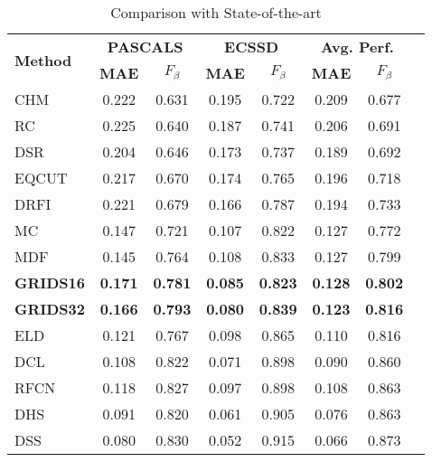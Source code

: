 \documentclass[a4paper,conference]{IEEEtran}
\begin{document}
\begin{table}
  \caption{Comparison with State-of-the-art}
  \centering
  \renewcommand{\arraystretch}{1.2}
  \begin{tabular}{|p{1cm}|c|c|c|c|c|c|c|}
    \hline
    \multirow{2}{2cm}{\textbf{Method}} & \multicolumn{2}{c|}{\textbf{PASCALS}} & \multicolumn{2}{c|}{\textbf{ECSSD}} & \multicolumn{2}{c|}{\textbf{Avg. Perf.}}   \\
    \cline{2-7}
    & \textbf{MAE} & \textbf{$F_\beta$} & \textbf{MAE} & \textbf{$F_\beta$} & \textbf{MAE} & \textbf{$F_\beta$}  \\
    \hline

    CHM & 0.222 & 0.631 & 0.195 & 0.722 & 0.209 & 0.677  \\ \hline
    RC & 0.225 & 0.640 & 0.187 & 0.741 & 0.206 & 0.691 \\ \hline
    DSR & 0.204 & 0.646 & 0.173 & 0.737 & 0.189 & 0.692  \\ \hline
    EQCUT & 0.217 & 0.670 & 0.174 & 0.765 & 0.196 & 0.718  \\ \hline
    DRFI & 0.221 & 0.679 & 0.166 & 0.787 & 0.194 & 0.733 \\ \hline
    MC & 0.147 & 0.721 & 0.107 & 0.822 & 0.127 & 0.772  \\ \hline
    MDF & 0.145 & 0.764 & 0.108 & 0.833 & 0.127 & 0.799   \\ \hline
    \textbf{GRIDS16} & \textbf{0.171} & \textbf{0.781} & \textbf{0.085} & \textbf{0.823} & \textbf{0.128} & \textbf{0.802} \\ \hline
        \textbf{GRIDS32} & \textbf{0.166} & \textbf{0.793} & \textbf{0.080} & \textbf{0.839} & \textbf{0.123} & \textbf{0.816} \\ \hline    ELD & 0.121 & 0.767 & 0.098 & 0.865 & 0.110 & 0.816  \\ \hline
    DCL & 0.108 & 0.822 & 0.071 & 0.898 & 0.090 & 0.860 \\ \hline
    RFCN & 0.118 & 0.827 & 0.097 & 0.898 & 0.108 & 0.863  \\ \hline
    DHS & 0.091 & 0.820 & 0.061 & 0.905 & 0.076 & 0.863  \\ \hline
    DSS & 0.080 & 0.830 & 0.052 & 0.915 & 0.066 & 0.873  \\ \hline
  \end{tabular}
  \label{table1}

\end{table}
\end{document}
